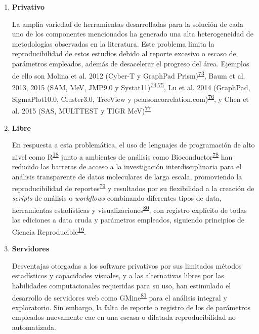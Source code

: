 \documentclass[]{article}
\begin{document}
\begin{enumerate}
\begin{enumerate}
    \begin{enumerate}
    \def\labelenumiii{\arabic{enumiii}.}
    \item
      \textbf{Privativo}

      La amplia variedad de herramientas desarrolladas para la solución
      de cada uno de los componentes mencionados ha generado una alta
      heterogeneidad de metodologías observadas en la literatura. Este
      problema limita la reproducibilidad de estos estudios debido al
      reporte excesivo o escaso de parámetros empleados, además de
      desacelerar el progreso del área. Ejemplos de ello son Molina et
      al. 2012 (Cyber-T y GraphPad
      Prism)\textsuperscript{\protect\hyperlink{ref-molina2012}{73}},
      Baum et al. 2013, 2015 (SAM, MeV, JMP9.0 y
      Systat11)\textsuperscript{\protect\hyperlink{ref-baum2013}{74},\protect\hyperlink{ref-baum2015}{75}},
      Lu et al. 2014 (GraphPad, SigmaPlot10.0, Cluster3.0, TreeView y
      pearsoncorrelation.com)\textsuperscript{\protect\hyperlink{ref-lu2014rama}{76}},
      y Chen et al. 2015 (SAS, MULTTEST y TIGR
      MeV)\textsuperscript{\protect\hyperlink{ref-chen2015immunomics}{77}}
    \item
      \textbf{Libre}

      En respuesta a esta problemática, el uso de lenguajes de
      programación de alto nivel como
      R\textsuperscript{\protect\hyperlink{ref-R}{18}} junto a ambientes
      de análisis como
      Bioconductor\textsuperscript{\protect\hyperlink{ref-bioconductor2004}{78}}
      han reducido las barreras de acceso a la investigación
      interdisciplinaria para el análisis transparente de datos
      moleculares de larga escala, promoviendo la reproducibilidad de
      reportes\textsuperscript{\protect\hyperlink{ref-knitr}{79}} y
      resultados por su flexibilidad a la creación de \emph{scripts} de
      análisis o \emph{workflows} combinando diferentes tipos de data,
      herramientas estadísticas y
      visualizaciones\textsuperscript{\protect\hyperlink{ref-Biobase}{80}},
      con registro explícito de todas las ediciones a data cruda y
      parámetros empleados, siguiendo principios de Ciencia
      Reproducible\textsuperscript{\protect\hyperlink{ref-CienciaReproducible2016}{19}}.
      \newpage
    \item
      \textbf{Servidores}

      Desventajas otorgadas a los software privativos por sus limitados
      métodos estadísticos y capacidades visuales, y a las alternativas
      libres por las habilidades computacionales requeridas para su uso,
      han estimulado el desarrollo de servidores web como
      GMine\textsuperscript{\protect\hyperlink{ref-gmine2016}{81}} para
      el análisis integral y exploratorio. Sin embargo, la falta de
      reporte o registro de los de parámetros empleados nuevamente cae
      en una escasa o dilatada reproducibilidad no automatizada.
    \end{enumerate}
  \end{enumerate}
\end{enumerate}
\end{document}
